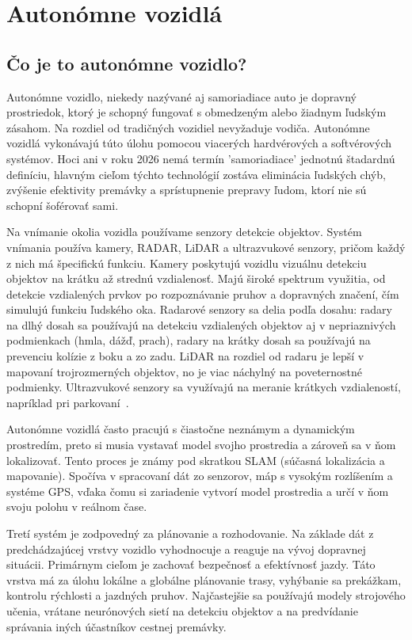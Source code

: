 \section{Autonómne vozidlá}\label{sec:AutonomneVozidla}
\subsection{Čo je to autonómne vozidlo?}
Autonómne vozidlo, niekedy nazývané aj samoriadiace auto je dopravný prostriedok, ktorý je schopný fungovať s obmedzeným alebo žiadnym ľudským zásahom. Na rozdiel od tradičných vozidiel nevyžaduje vodiča. Autonómne vozidlá vykonávajú túto úlohu pomocou viacerých hardvérových a softvérových systémov. Hoci ani v roku 2026 nemá termín 'samoriadiace' jednotnú štadardnú definíciu, hlavným cieľom týchto technológií zostáva eliminácia ľudských chýb, zvýšenie efektivity premávky a sprístupnenie prepravy ľudom, ktorí nie sú schopní šoférovať sami.\par
Na vnímanie okolia vozidla používame senzory detekcie objektov. Systém vnímania používa kamery, RADAR, LiDAR a ultrazvukové senzory, pričom každý z nich má špecifickú funkciu. Kamery poskytujú vozidlu vizuálnu detekciu objektov na krátku až strednú vzdialenosť. Majú široké spektrum využitia, od detekcie vzdialených prvkov po rozpoznávanie pruhov a dopravných značení, čím simulujú funkciu ľudského oka. Radarové senzory sa delia podľa dosahu: radary na dlhý dosah sa používajú na detekciu vzdialených objektov aj v nepriaznivých podmienkach (hmla, dážď, prach), radary na krátky dosah sa používajú na prevenciu kolízie z boku a zo zadu. LiDAR na rozdiel od radaru je lepší v mapovaní trojrozmerných objektov, no je viac náchylný na poveternostné podmienky. Ultrazvukové senzory sa využívajú na meranie krátkych vzdialeností, napríklad pri parkovaní~\cite{wevolver2020}.\par
Autonómne vozidlá často pracujú s čiastočne neznámym a dynamickým prostredím, preto si musia vystavať model svojho prostredia a zároveň sa v ňom lokalizovať. Tento proces je známy pod skratkou SLAM (súčasná lokalizácia a mapovanie). Spočíva v spracovaní dát zo senzorov, máp s vysokým rozlíšením a systéme GPS, vďaka čomu si zariadenie vytvorí model prostredia a určí v ňom svoju polohu v reálnom čase.\par
Tretí systém je zodpovedný za plánovanie a rozhodovanie. Na základe dát z predchádzajúcej vrstvy vozidlo vyhodnocuje a reaguje na vývoj dopravnej situácii. Primárnym cieľom je zachovať bezpečnosť a efektívnosť jazdy. Táto vrstva má za úlohu lokálne a globálne plánovanie trasy, vyhýbanie sa prekážkam, kontrolu rýchlosti a jazdných pruhov. Najčastejšie sa používajú modely strojového učenia, vrátane neurónových sietí na detekciu objektov a na predvídanie správania iných účastníkov cestnej premávky.\par

